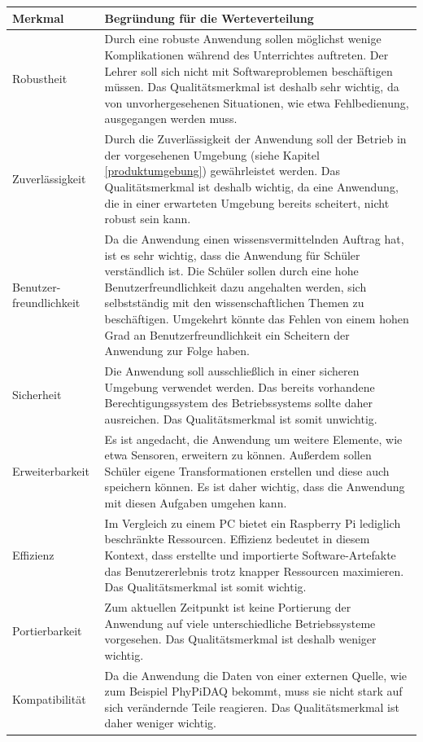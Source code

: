 \documentclass[parskip=full]{scrartcl}
\begin{document}
\begin{tabular}{| p{3cm} | p{10cm} |}
	\hline
	\textbf{Merkmal} & \textbf{Begründung für die Werteverteilung}\\
	\hline
	Robustheit & Durch eine robuste Anwendung sollen möglichst wenige Komplikationen während des Unterrichtes auftreten. Der Lehrer soll sich nicht mit Softwareproblemen beschäftigen müssen. Das Qualitätsmerkmal ist deshalb sehr wichtig, da von unvorhergesehenen Situationen, wie etwa Fehlbedienung, ausgegangen werden muss.\\\cline{1-2}
	Zuverlässigkeit & Durch die Zuverlässigkeit der Anwendung soll der Betrieb in der vorgesehenen Umgebung (siehe Kapitel \ref{produktumgebung}) gewährleistet werden. Das Qualitätsmerkmal ist deshalb wichtig, da eine Anwendung, die in einer erwarteten Umgebung bereits scheitert, nicht robust sein kann.\\\cline{1-2}
	Benutzer-\newline freundlichkeit & Da die Anwendung einen wissensvermittelnden Auftrag hat, ist es sehr wichtig, dass die Anwendung für Schüler verständlich ist. Die Schüler sollen durch eine hohe Benutzerfreundlichkeit dazu angehalten werden, sich selbstständig mit den wissenschaftlichen Themen zu beschäftigen. Umgekehrt könnte das Fehlen von einem hohen Grad an Benutzerfreundlichkeit ein Scheitern der Anwendung zur Folge haben.\\\cline{1-2}
	Sicherheit & Die Anwendung soll ausschließlich in einer sicheren Umgebung verwendet werden. Das bereits vorhandene Berechtigungssystem des Betriebssystems sollte daher ausreichen. Das Qualitätsmerkmal ist somit unwichtig.\\\cline{1-2}
	Erweiterbarkeit & Es ist angedacht, die Anwendung um weitere Elemente, wie etwa Sensoren, erweitern zu können. Außerdem sollen Schüler eigene Transformationen erstellen und diese auch speichern können. Es ist daher wichtig, dass die Anwendung mit diesen Aufgaben umgehen kann.\\\cline{1-2}
	Effizienz & Im Vergleich zu einem PC bietet ein Raspberry Pi lediglich beschränkte Ressourcen. Effizienz bedeutet in diesem Kontext, dass erstellte und importierte Software-Artefakte das Benutzererlebnis trotz knapper Ressourcen maximieren. Das Qualitätsmerkmal ist somit wichtig.\\\cline{1-2}
	Portierbarkeit & Zum aktuellen Zeitpunkt ist keine Portierung der Anwendung auf viele unterschiedliche Betriebssysteme vorgesehen. Das Qualitätsmerkmal ist deshalb weniger wichtig.\\\cline{1-2}
	Kompatibilität & Da die Anwendung die Daten von einer externen Quelle, wie zum Beispiel \gls{PhyPiDAQ} bekommt, muss sie nicht stark auf sich verändernde Teile reagieren. Das Qualitätsmerkmal ist daher weniger wichtig.\\\cline{1-2}
	\hline
\end{tabular}
\end{document}
